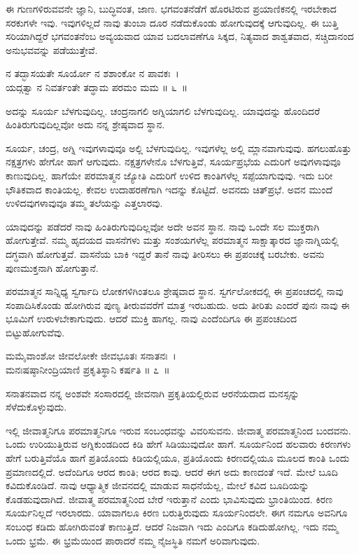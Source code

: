 ಈ ಗುಣಗಳಿರುವವನೇ ಜ್ಞಾನಿ, ಬುದ್ಧಿವಂತ, ಜಾಣ. ಭಗವಂತನೆಡೆಗೆ ಹೊರಟಿರುವ ಪ್ರಯಾಣಿಕನಲ್ಲಿ ಇರಬೇಕಾದ ಸರಕುಗಳೇ ಇವು. ಇವುಗಳಿಲ್ಲದೆ ನಾವು ತುಂಬಾ ದೂರ ನಡೆದುಕೊಂಡು ಹೋಗುವುದಕ್ಕೆ ಆಗುವುದಿಲ್ಲ. ಈ ಬುತ್ತಿ ಸರಿಯಾಗಿದ್ದರೆ ಭಗವಂತನೆಂಬ ಅವ್ಯಯವಾದ ಯಾವ ಬದಲಾವಣೆಗೂ ಸಿಕ್ಕದ, ನಿತ್ಯವಾದ ಶಾಶ್ವತವಾದ, ಸಚ್ಚಿದಾನಂದ ಅನುಭವವನ್ನು ಪಡೆಯುತ್ತೇವೆ.

\begin{shloka}
ನ ತದ್ಭಾಸಯತೇ ಸೂರ್ಯೋ ನ ಶಶಾಂಕೋ ನ ಪಾವಕಃ~।\\ಯದ್ಗತ್ವಾ ನ ನಿವರ್ತಂತೇ ತದ್ಧಾಮ ಪರಮಂ ಮಮ \hfill॥ ೬~॥
\end{shloka}

\begin{artha}
ಅದನ್ನು ಸೂರ್ಯ ಬೆಳಗುವುದಿಲ್ಲ. ಚಂದ್ರನಾಗಲಿ ಅಗ್ನಿಯಾಗಲಿ ಬೆಳಗುವುದಿಲ್ಲ. ಯಾವುದನ್ನು ಹೊಂದಿದರೆ ಹಿಂತಿರುಗುವುದಿಲ್ಲವೋ ಅದು ನನ್ನ ಶ್ರೇಷ್ಠವಾದ ಸ್ಥಾನ.
\end{artha}

ಸೂರ್ಯ, ಚಂದ್ರ, ಅಗ್ನಿ ಇವುಗಳಾವುವೂ ಅಲ್ಲಿ ಬೆಳಗುವುದಿಲ್ಲ. ಇವುಗಳೆಲ್ಲ ಅಲ್ಲಿ ಮ್ಲಾನವಾಗುವುವು. ಹಗಲುಹೊತ್ತು ನಕ್ಷತ್ರಗಳು ಹೇಗೋ ಹಾಗೆ ಆಗುವುದು. ನಕ್ಷತ್ರಗಳೇನೊ ಬೆಳಗುತ್ತಿವೆ, ಸೂರ್ಯಪ್ರಭೆಯ ಎದುರಿಗೆ ಅವುಗಳಾವುವೂ ಕಾಣುವುದಿಲ್ಲ. ಹಾಗೆಯೇ ಪರ\-ಮಾತ್ಮನ ಜ್ಯೋತಿ ಎದುರಿಗೆ ಉಳಿದ ಕಾಂತಿಗಳೆಲ್ಲ ಸಪ್ಪೆಯಾಗುವುವು. ಇದು ಬರೀ ಭೌತಿಕವಾದ ಕಾಂತಿಯಲ್ಲ. ಕೇವಲ ಉದಾಹರಣೆಗಾಗಿ ಇದನ್ನು ಕೊಟ್ಟಿದೆ. ಅವನದು ಚಿತ್​ಪ್ರಭೆ. ಅವನ ಮುಂದೆ ಉಳಿದವುಗಳಾವುವೂ ತಮ್ಮ ತಲೆಯನ್ನು ಎತ್ತಲಾರವು.

ಯಾವುದನ್ನು ಪಡೆದರೆ ನಾವು ಹಿಂತಿರುಗುವುದಿಲ್ಲವೋ ಅದೇ ಅವನ ಸ್ಥಾನ. ನಾವು ಒಂದೇ ಸಲ ಮುಕ್ತರಾಗಿ ಹೋಗುತ್ತೇವೆ. ನಮ್ಮ ಹೃದಯದ ವಾಸನೆಗಳು ಮತ್ತು ಸಂಶಯಗಳೆಲ್ಲ ಪರಮಾತ್ಮನ ಸಾಕ್ಷಾತ್ಕಾರದ ಜ್ಞಾನಾಗ್ನಿಯಲ್ಲಿ ದಗ್ಧವಾಗಿ ಹೋಗುತ್ತವೆ. ವಾಸನೆಯ ಬಾಕಿ ಇದ್ದರೆ ತಾನೆ ನಾವು ತೀರಿಸಲು ಈ ಪ್ರಪಂಚಕ್ಕೆ ಬರಬೇಕು. ಅವನು ಪುಣಮುಕ್ತನಾಗಿ ಹೋಗುತ್ತಾನೆ.

ಪರಮಾತ್ಮನ ಸಾನ್ನಿಧ್ಯ ಸ್ವರ್ಗಾದಿ ಲೋಕಗಳಿಗಿಂತಲೂ ಶ್ರೇಷ್ಠವಾದ ಸ್ಥಾನ. ಸ್ವರ್ಗಲೋಕದಲ್ಲಿ ಈ ಪ್ರಪಂಚದಲ್ಲಿ ನಾವು ಸಂಪಾದಿಸಿಕೊಂಡು ಹೋಗಿರುವ ಪುಣ್ಯ ತೀರುವವರೆಗೆ ಮಾತ್ರ ಇರಬಹುದು. ಅದು ತೀರಿತು ಎಂದರೆ ಪುನಃ ನಾವು ಈ ಭೂಮಿಗೆ ಉರುಳಬೇಕಾಗುವುದು. ಆದರೆ ಮುಕ್ತಿ ಹಾಗಲ್ಲ. ನಾವು ಎಂದೆಂದಿಗೂ ಈ ಪ್ರಪಂಚದಿಂದ ಬಿಟ್ಟುಹೋಗುವೆವು.

\begin{shloka}
ಮಮೈವಾಂಶೋ ಜೀವಲೋಕೇ ಜೀವಭೂತಃ ಸನಾತನಃ~।\\ಮನಃಷಷ್ಠಾನೀಂದ್ರಿಯಾಣಿ ಪ್ರಕೃತಿಸ್ಥಾನಿ ಕರ್ಷತಿ \hfill॥ ೭~॥
\end{shloka}

\begin{artha}
ಸನಾತನವಾದ ನನ್ನ ಅಂಶವೇ ಸಂಸಾರದಲ್ಲಿ ಜೀವನಾಗಿ ಪ್ರಕೃತಿಯಲ್ಲಿರುವ ಆರನೆಯದಾದ ಮನಸ್ಸನ್ನು ಸೆಳೆದುಕೊಳ್ಳುವುದು.
\end{artha}

ಇಲ್ಲಿ ಜೀವಾತ್ಮನಿಗೂ ಪರಮಾತ್ಮನಿಗೂ ಇರುವ ಸಂಬಂಧವನ್ನು ವಿವರಿಸುವನು. ಜೀವಾತ್ಮ ಪರಮಾತ್ಮನಿಂದ ಬಂದವನು. ಒಂದು ಉರಿಯುತ್ತಿರುವ ಅಗ್ನಿಕುಂಡದಿಂದ ಕಿಡಿ ಹೇಗೆ ಸಿಡಿಯು\-ವುದೋ ಹಾಗೆ. ಸೂರ್ಯನಿಂದ ಹಲವಾರು ಕಿರಣಗಳು ಹೇಗೆ ಬರುತ್ತಿವೆಯೊ ಹಾಗೆ ಪ್ರತಿಯೊಂದು ಕಿಡಿಯಲ್ಲಿಯೂ, ಪ್ರತಿಯೊಂದು ಕಿರಣದಲ್ಲಿಯೂ ಮೂಲದ ಕಾಂತಿ ಒಂದು ಪ್ರಮಾಣದಲ್ಲಿದೆ. ಅದೆಂದಿಗೂ ಆರದ ಕಾಂತಿ; ಆರದ ಕಾವು. ಆದರೆ ಈಗ ಅದು ಕಾಣದಂತೆ ಇದೆ. ಮೇಲೆ ಬೂದಿ ಕವಿದುಕೊಂಡಿದೆ. ನಾವು ಆಧ್ಯಾತ್ಮಿಕ ಜೀವನದಲ್ಲಿ ಮಾಡುವ ಸಾಧನೆಯೆಲ್ಲ, ಮೇಲೆ ಕವಿದ ಬೂದಿಯನ್ನು ಕೊಡಹುವುದಾಗಿದೆ. ಜೀವಾತ್ಮ ಪರಮಾತ್ಮನಿಂದ ಬೇರೆ ಇರುತ್ತಾನೆ ಎಂದು ಭಾವಿಸುವುದು ಭ್ರಾಂತಿಯಿಂದ. ಕಿರಣ ಸೂರ್ಯನಿಲ್ಲದೆ ಇರಲಾರದು. ಯಾವಾಗಲೂ ಕಿರಣ ಬರುತ್ತಿರುವುದು ಸೂರ್ಯನಿಂದಲೇ. ಈಗ ನಮಗೂ ಅವನಿಗೂ ಸಂಬಂಧ ಕಡಿದು ಹೋಗಿರುವಂತೆ ಕಾಣುತ್ತಿದೆ. ಆದರೆ ನಿಜವಾಗಿ ಇದು ಎಂದಿಗೂ ಕಡಿದುಹೋಗಿಲ್ಲ. ಇದು ನಮ್ಮ ಒಂದು ಭ್ರಮೆ. ಈ ಭ್ರಮೆಯಿಂದ ಪಾರಾದರೆ ನಮ್ಮ ನೈಜಸ್ಥಿತಿ ನಮಗೆ ಅರಿವಾಗುವುದು.

